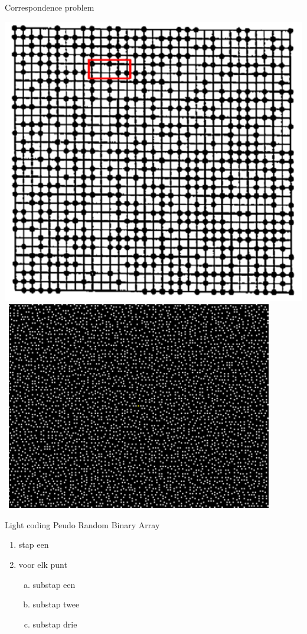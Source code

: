 \begin{frame}{Correspondence problem}
\centerline{\includegraphics[scale=0.25]{images/prba}\, \includegraphics[scale=1, clip=true, viewport= 0 0 80 63]{kinect-pattern}   }
\begin{block}{Light coding}
Peudo Random Binary Array
\end{block}
\pause
\begin{enumerate}
\item<+-> stap een
\item<+-> voor elk punt
\begin{enumerate}[a.]
\item<+-> substap een
\item<+-> substap twee
\item<+-> substap drie
\end{enumerate}
\end{enumerate}
\end{frame}

